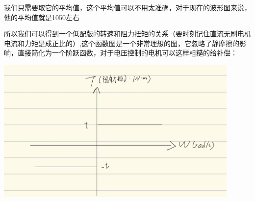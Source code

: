 \documentclass[UTF8,a4paper,12pt]{ctexart}
\begin{document}
        \begin{flushleft}
          我们只需要取它的平均值，这个平均值可以不用太准确，对于现在的波形图来说，他的平均值就是1050左右
        \end{flushleft}
          所以我们可以得到一个低配版的转速和阻力扭矩的关系（要时刻记住直流无刷电机电流和力矩是成正比的）,这个函数图是一个非常理想的图，它忽略了静摩擦的影响，直接简化为一个阶跃函数，对于电压控制的电机可以这样粗糙的给补偿：
          \par \includegraphics[width=12cm]{picture/yaw_compensation.png}
\end{document}
